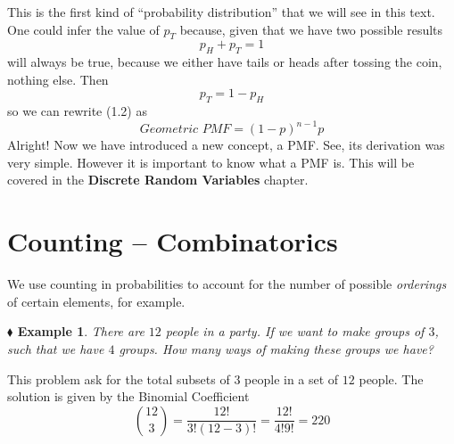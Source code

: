 \documentclass{report}
\newtheorem{example}{$\blacklozenge$ Example}[chapter]
\begin{document}
This is the first kind of ``probability distribution'' that we will see in this text. One could infer
the value of $p_T$ because, given that we have two possible results
\begin{equation}
    p_H + p_T = 1
\end{equation}
will always be true, because we either have tails or heads after tossing the coin, nothing else. Then
\begin{equation}
    p_T = 1 - p_H
\end{equation}
so we can rewrite (1.2) as
\begin{equation}
    \textit{Geometric PMF} = (1-p)^{n-1}p
\end{equation}
Alright! Now we have introduced a new concept, a PMF. See, its derivation was very simple. However it is
important to know what a PMF is. This will be covered in the \textbf{Discrete Random Variables} chapter.

\section{Counting -- Combinatorics}
We use counting in probabilities to account for the number of possible \textit{orderings} of certain elements,
for example.

\begin{example}
    There are $12$ people in a party. If we want to make groups of $3$, such that we have $4$ groups. How many ways
    of making these groups we have?
\end{example}
This problem ask for the total subsets of $3$ people in a set of $12$ people. The solution is given by the
Binomial Coefficient
\begin{equation}
    \binom{12}{3} = \frac{12!}{3!(12-3)!} = \frac{12!}{4!9!} = 220
\end{equation}
\end{document}
